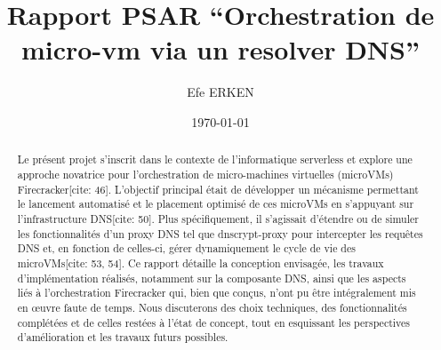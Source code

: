 \documentclass[12pt]{article}
\author{Efe ERKEN}
\date{\today}
\title{Rapport PSAR ``Orchestration de micro-vm via un resolver DNS''}
\begin{document}
\maketitle

\begin{abstract}
Le présent projet s'inscrit dans le contexte de l'informatique serverless et explore une approche novatrice pour l'orchestration de micro-machines virtuelles (microVMs) Firecracker[cite: 46]. L'objectif principal était de développer un mécanisme permettant le lancement automatisé et le placement optimisé de ces microVMs en s'appuyant sur l'infrastructure DNS[cite: 50]. Plus spécifiquement, il s'agissait d'étendre ou de simuler les fonctionnalités d'un proxy DNS tel que dnscrypt-proxy pour intercepter les requêtes DNS et, en fonction de celles-ci, gérer dynamiquement le cycle de vie des microVMs[cite: 53, 54]. Ce rapport détaille la conception envisagée, les travaux d'implémentation réalisés, notamment sur la composante DNS, ainsi que les aspects liés à l'orchestration Firecracker qui, bien que conçus, n'ont pu être intégralement mis en œuvre faute de temps. Nous discuterons des choix techniques, des fonctionnalités complétées et de celles restées à l'état de concept, tout en esquissant les perspectives d'amélioration et les travaux futurs possibles.
\end{abstract}
\end{document}
